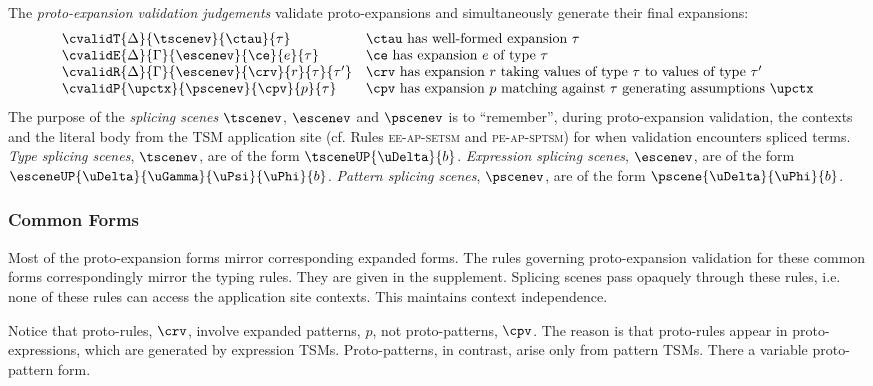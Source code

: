 \documentclass[acmlarge,review,anonymous]{acmart}\settopmatter{printfolios=true}
\begin{document}
The \emph{proto-expansion validation judgements} validate proto-expansions and simultaneously generate their final expansions:%
\[\begin{array}{ll}
\cvalidT{\Delta}{\tscenev}{\ctau}{\tau} & \text{$\ctau$ has well-formed expansion $\tau$}\\
\cvalidE{\Delta}{\Gamma}{\escenev}{\ce}{e}{\tau} & \text{$\ce$ has expansion $e$ of type $\tau$}\\
\cvalidR{\Delta}{\Gamma}{\escenev}{\crv}{r}{\tau}{\tau'} & \text{$\crv$ has expansion $r$ taking values of type $\tau$ to values of type $\tau'$}\\
\cvalidP{\upctx}{\pscenev}{\cpv}{p}{\tau} & \text{$\cpv$ has expansion $p$ matching against $\tau$ generating assumptions $\upctx$}
\end{array}\]
The purpose of the \emph{splicing scenes} $\tscenev$, $\escenev$ and $\pscenev$ is to ``remember'', during proto-expansion validation, the contexts and the literal body from the TSM application site (cf. Rules \textsc{ee-ap-setsm} and \textsc{pe-ap-sptsm}) for when validation encounters spliced terms. \emph{Type splicing scenes}, $\tscenev$, are of the form $\tsceneUP{\uDelta}{b}$. \emph{Expression splicing scenes}, $\escenev$, are of the form $\esceneUP{\uDelta}{\uGamma}{\uPsi}{\uPhi}{b}$. \emph{Pattern splicing scenes}, $\pscenev$, are of the form $\pscene{\uDelta}{\uPhi}{b}$. 

\subsubsection{Common Forms} Most of the proto-expansion forms mirror corresponding expanded forms. The rules governing proto-expansion validation for these common forms correspondingly mirror the typing rules. They are given in the supplement. Splicing scenes pass opaquely through these rules, i.e. none of these rules can access the application site contexts. This maintains context independence. 

Notice that proto-rules, $\crv$, involve expanded patterns, $p$, not proto-patterns, $\cpv$. The reason is that proto-rules appear in proto-expressions, which are generated by expression TSMs. Proto-patterns, in contrast, arise only from pattern TSMs. There a variable proto-pattern form.
\end{document}
